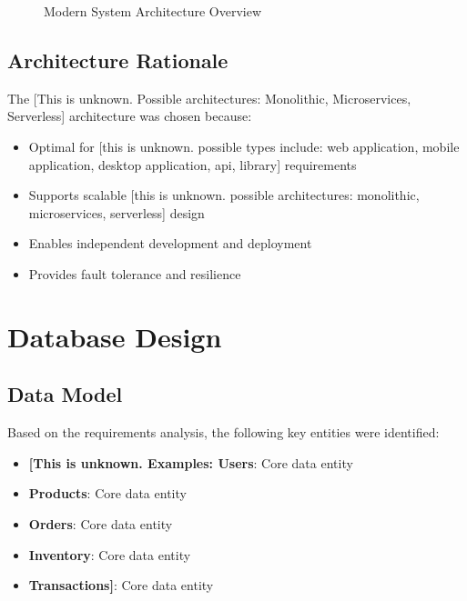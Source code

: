 \documentclass[11pt,a4paper,oneside]{article}
\begin{document}
\begin{figure}[H]
\caption{Modern System Architecture Overview}
\label{fig:architecture}
\end{figure}


\subsection{Architecture Rationale}

The [This is unknown.  Possible architectures: Monolithic, Microservices, Serverless] architecture was chosen because:
\begin{itemize}
\item Optimal for [this is unknown. possible types include: web application, mobile application, desktop application, api, library] requirements
\item Supports scalable [this is unknown. possible architectures: monolithic, microservices, serverless] design
\item Enables independent development and deployment
\item Provides fault tolerance and resilience
\end{itemize}

\section{Database Design}

\subsection{Data Model}

Based on the requirements analysis, the following key entities were identified:
\begin{itemize}
\item \textbf{[This is unknown. Examples: Users}: Core data entity
\item \textbf{Products}: Core data entity
\item \textbf{Orders}: Core data entity
\item \textbf{Inventory}: Core data entity
\item \textbf{Transactions]}: Core data entity
\end{itemize}
\end{document}
